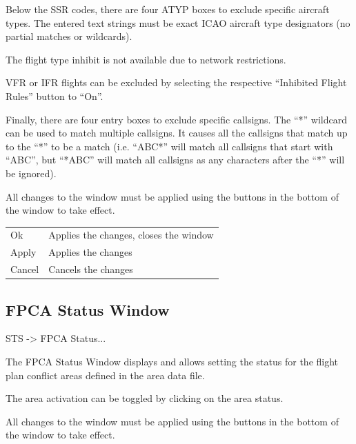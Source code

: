 \documentclass[a4paper,oneside,11pt]{memoir}
\begin{document}
\bigskip

Below the SSR codes, there are four ATYP boxes to exclude specific aircraft types. The entered text strings must be exact ICAO aircraft type designators (no partial matches or wildcards).

\bigskip

The flight type inhibit is not available due to network restrictions.

\bigskip

VFR or IFR flights can be excluded by selecting the respective “Inhibited Flight Rules” button to “On”.

\bigskip

Finally, there are four entry boxes to exclude specific callsigns. The “*” wildcard can be used to match multiple callsigns. It causes all the callsigns that match up to the “*” to be a match (i.e. “ABC*” will match all callsigns that start with “ABC”, but “*ABC” will match all callsigns as any characters after the “*” will be ignored).

\bigskip

All changes to the window must be applied using the buttons in the bottom of the window to take effect.

\bigskip

\begin{longtable}{p{2.5cm} p{10cm}}
    Ok      & Applies the changes, closes the window\\
    Apply   & Applies the changes\\
    Cancel  & Cancels the changes\\
\end{longtable}

\subsection{FPCA Status Window}\label{win:fpcas}

 STS -> FPCA Status...


The FPCA Status Window displays and allows setting the status for the flight plan conflict areas defined in the area data file.

\bigskip

The area activation can be toggled by clicking on the area status.

\bigskip

All changes to the window must be applied using the buttons in the bottom of the window to take effect.
\end{document}
